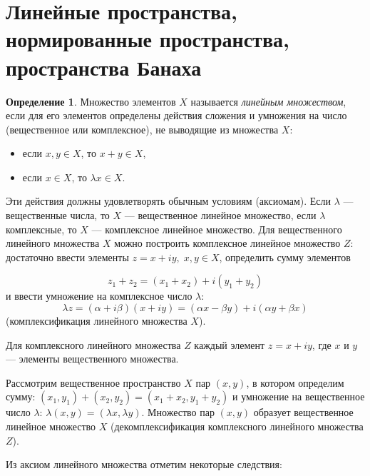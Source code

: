 \documentclass[12pt,a4paper,titlepage,oneside]{book}
\theoremstyle{definition}
\newtheorem*{definition}{Определение}
\theoremstyle{plain}
\theoremstyle{break}
\theoremstyle{remark}
\theoremstyle{remark}
\theoremstyle{remark}
\theoremstyle{remark}
\theoremstyle{plain}
\theoremstyle{plain}
\begin{document}
\section{Линейные пространства, нормированные пространства, пространства Банаха}

\begin{definition}

Множество элементов $X$ называется \textit{линейным множеством}, если для его элементов определены действия сложения и умножения на число (вещественное или комплексное), не выводящие из множества $X$:

\begin{itemize}

	\item если $x,y\in X$, то $x+y\in X$,

	\item если $x\in X$, то $\lambda x\in X$.

\end{itemize}

\end{definition}


Эти действия должны удовлетворять обычным условиям (аксиомам). Если $\lambda$ --- вещественные числа, то $X$ --- вещественное линейное множество, если $\lambda$ комплексные, то $X$ --- комплексное линейное множество. Для вещественного линейного множества $X$ можно построить комплексное линейное множество $Z$: достаточно ввести элементы $z=x+iy,\; x, y \in X$, определить сумму элементов

\begin{equation*}
z_1+z_2=(x_1+x_2)+i(y_1+y_2)
\end{equation*}
и ввести умножение на комплексное число $\lambda$:
\begin{equation*}
\lambda z = (\alpha + i\beta)(x+iy) = (\alpha x - \beta y)+i(\alpha y + \beta x)
\end{equation*}
(комплексификация линейного множества $X$).

Для комплексного линейного множества $Z$ каждый элемент $z=x+iy$, где $x$ и $y$ --- элементы вещественного множества.

Рассмотрим вещественное пространство $X$ пар $(x,y)$, в котором определим сумму: $(x_1,y_1)+(x_2,y_2) = (x_1+x_2,y_1+y_2)$ и умножение на вещественное число $\lambda$: $\lambda(x,y) = (\lambda x, \lambda y)$. Множество пар $(x,y)$ образует вещественное линейное множество  $X$ (декомплексификация комплексного линейного множества $Z$).

Из аксиом линейного множества отметим некоторые следствия:
\end{document}
